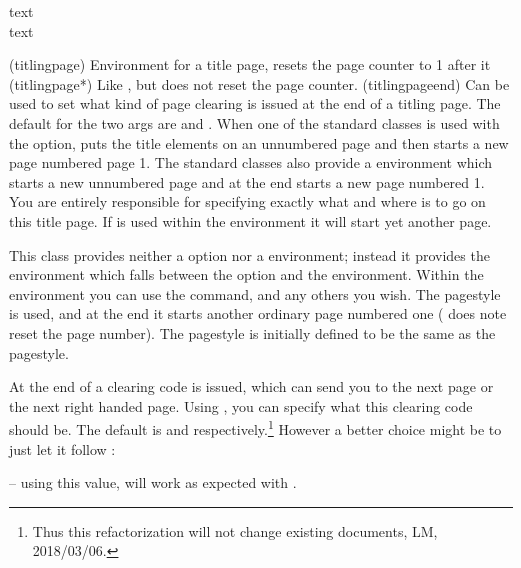 \begin{syntax}
 text  \\
 text \\
\cmd{\titlingpageend} 
\end{syntax}
\glossary(titlingpage)%
  {}%
  {Environment for a title page, resets the page counter to 1 after it}
\glossary(titlingpage*)%
  {}%
  {Like , but does not reset the page counter.}%
\glossary(titlingpageend)%
  {}%
  {Can be used to set what kind of page clearing is issued at the end
    of a titling page. The default for the two args are
     and .}
When one of the standard classes is used with the 
option, \cmd{\maketitle} puts the title elements on an unnumbered page
and then starts a new page numbered page 1. 
The standard classes also provide
a  environment which starts a new unnumbered page and at the
end starts a new page numbered 1. You are entirely responsible
for specifying exactly what and where is to go on this title page.
If \cmd{\maketitle} is used  within the  environment it
will start yet another page.

   This class provides neither a  option nor
a  environment; instead it provides the 
environment which falls between the 
option and the  environment. Within the 
environment you can use the \cmd{\maketitle} command, and any others 
you wish. The  pagestyle is used, and 
at the end it starts another ordinary page numbered one
( does note reset the page number). 
The  pagestyle is initially defined to be the same
as the  pagestyle.

At the end of a  clearing code is issued, which can
send you to the next page or the next right handed page. Using
\cmd{\titlingpageend}, you can
specify what this clearing code should be. The default is
 and  respectively.\footnote{Thus
  this refactorization will not change existing documents, LM, 2018/03/06.} However a
better choice might be to just let it follow :
\begin{lcode}
  \titlingpageend{\clearforchapter}{\clearforchapter}
\end{lcode}
-- using this value,  will work as expected with .


